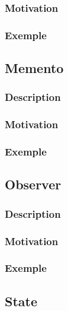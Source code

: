 \documentclass[french]{article}
\begin{document}
\subsubsection{Motivation}

\subsubsection{Exemple}



\subsection{Memento}

\subsubsection{Description}

\subsubsection{Motivation}

\subsubsection{Exemple}



\subsection{Observer}

\subsubsection{Description}

\subsubsection{Motivation}

\subsubsection{Exemple}



\subsection{State}
\end{document}

